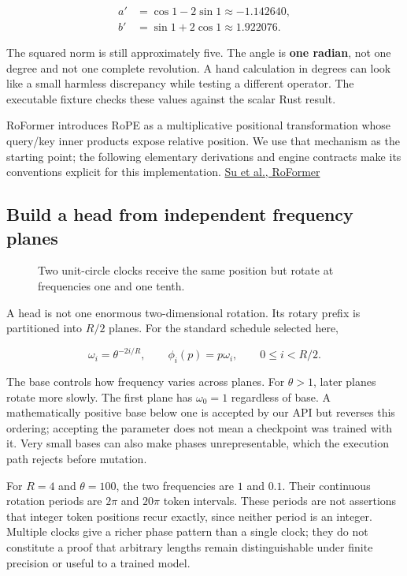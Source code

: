 \documentclass[
  10pt,
]{article}
\begin{document}
\[
\begin{aligned}
a'&=\cos 1-2\sin 1\approx-1.142640,\\
b'&=\sin 1+2\cos 1\approx 1.922076.
\end{aligned}
\]

The squared norm is still approximately five. The angle is \textbf{one
radian}, not one degree and not one complete revolution. A hand
calculation in degrees can look like a small harmless discrepancy while
testing a different operator. The executable fixture checks these values
against the scalar Rust result.

RoFormer introduces RoPE as a multiplicative positional transformation
whose query/key inner products expose relative position. We use that
mechanism as the starting point; the following elementary derivations
and engine contracts make its conventions explicit for this
implementation. \href{https://arxiv.org/html/2104.09864v5}{Su et al.,
RoFormer}

\subsection{Build a head from independent frequency
planes}\label{build-a-head-from-independent-frequency-planes}

\begin{figure}[H]\centering\resizebox{\linewidth}{!}{}\caption{Two unit-circle clocks receive the same position but rotate at frequencies one and one tenth.}\end{figure}

A head is not one enormous two-dimensional rotation. Its rotary prefix
is partitioned into \(R/2\) planes. For the standard schedule selected
here,

\[
\omega_i=\theta^{-2i/R},\qquad
\phi_i(p)=p\omega_i,\qquad 0\le i<R/2.
\]

The base controls how frequency varies across planes. For \(\theta>1\),
later planes rotate more slowly. The first plane has \(\omega_0=1\)
regardless of base. A mathematically positive base below one is accepted
by our API but reverses this ordering; accepting the parameter does not
mean a checkpoint was trained with it. Very small bases can also make
phases unrepresentable, which the execution path rejects before
mutation.

For \(R=4\) and \(\theta=100\), the two frequencies are \(1\) and
\(0.1\). Their continuous rotation periods are \(2\pi\) and \(20\pi\)
token intervals. These periods are not assertions that integer token
positions recur exactly, since neither period is an integer. Multiple
clocks give a richer phase pattern than a single clock; they do not
constitute a proof that arbitrary lengths remain distinguishable under
finite precision or useful to a trained model.
\end{document}
